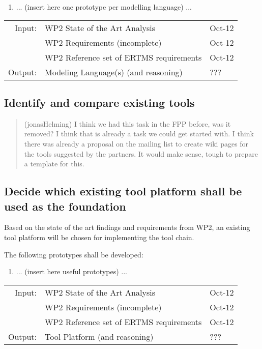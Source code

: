 \documentclass[11pt, a4paper]{article}
\newenvironment{inoutput}
{\vspace{2mm}
\noindent
\begin{tabular}{|r|p{.7\linewidth}|l|}
\hline}
{
\hline
\end{tabular}}
\begin{document}
\begin{enumerate}
\item ... (insert here one prototype per modelling language) ...
\end{enumerate}

\begin{inoutput}
Input: & WP2 State of the Art Analysis & Oct-12 \\
& WP2 Requirements (incomplete) & Oct-12 \\
& WP2 Reference set of ERTMS requirements & Oct-12 \\
\hline
Output: & Modeling Language(s) (and reasoning) & ??? \\
\end{inoutput}

\subsection{Identify and compare existing tools}
\begin{quotation}(jonasHelming) I think we had this task in the FPP before, was it removed? I think that is already a task we could get started with. I think there was already a proposal on the mailing list to create wiki pages for the tools suggested by the partners. It would make sense, tough to prepare a template for this.
\end{quotation}


\subsection{Decide which existing tool platform shall be used as the foundation}

Based on the state of the art findings and requirements from WP2, an existing tool platform will be chosen for implementing the tool chain.

The following prototypes shall be developed:

\begin{enumerate}
\item ... (insert here useful prototypes) ...
\end{enumerate}

\begin{inoutput}
Input: & WP2 State of the Art Analysis & Oct-12 \\
& WP2 Requirements (incomplete) & Oct-12 \\
& WP2 Reference set of ERTMS requirements & Oct-12 \\
\hline
Output: & Tool Platform (and reasoning) & ??? \\
\end{inoutput}
\end{document}
